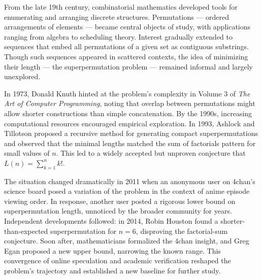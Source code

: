 \begin{historical}
From the late 19th century, combinatorial mathematics developed tools for enumerating and arranging discrete structures. Permutations — ordered arrangements of elements — became central objects of study, with applications ranging from algebra to scheduling theory. Interest gradually extended to sequences that embed all permutations of a given set as contiguous substrings. Though such sequences appeared in scattered contexts, the idea of minimizing their length — the superpermutation problem — remained informal and largely unexplored.

In 1973, Donald Knuth hinted at the problem's complexity in Volume 3 of \textit{The Art of Computer Programming}, noting that overlap between permutations might allow shorter constructions than simple concatenation. By the 1990s, increasing computational resources encouraged empirical exploration. In 1993, Ashlock and Tillotson proposed a recursive method for generating compact superpermutations and observed that the minimal lengths matched the sum of factorials pattern for small values of $n$. This led to a widely accepted but unproven conjecture that $L(n) = \sum_{k=1}^{n} k!$.

The situation changed dramatically in 2011 when an anonymous user on 4chan’s science board posed a variation of the problem in the context of anime episode viewing order. In response, another user posted a rigorous lower bound on superpermutation length, unnoticed by the broader community for years. Independent developments followed: in 2014, Robin Houston found a shorter-than-expected superpermutation for $n = 6$, disproving the factorial-sum conjecture. Soon after, mathematicians formalized the 4chan insight, and Greg Egan proposed a new upper bound, narrowing the known range. This convergence of online speculation and academic verification reshaped the problem’s trajectory and established a new baseline for further study.
\end{historical}
